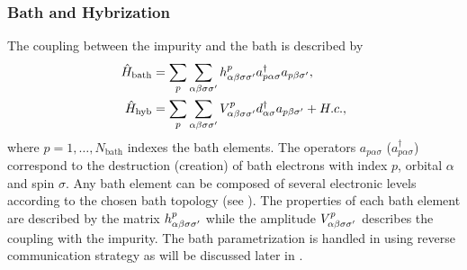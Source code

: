 \documentclass[edipack_sp.tex]{subfiles}
\begin{document}
\subsubsection{Bath and Hybrization}
The coupling between the impurity and the bath is described by
\begin{equation}\label{Hbath}
  \begin{split}
    \hat{H}_\mathrm{bath} &=
    \sum_p\sum_{\alpha\beta\sigma\sigma'}h^p_{\alpha\beta\sigma\sigma'}a^\dagger_{p\alpha\sigma}a_{p\beta\sigma'},\\
    \hat{H}_\mathrm{hyb} &= \sum_p\sum_{\alpha\beta\sigma\sigma'}V^p_{\alpha\beta\sigma\sigma'}d^\dagger_{\alpha\sigma}a_{p\beta\sigma'}+H.c., \\
\end{split}
\end{equation}
where $p=1,\dots,N_\mathrm{bath}$ indexes the
bath elements. The operators $a_{p\alpha\sigma}$
($a^\dagger_{p\alpha\sigma}$) correspond to the destruction (creation) of
bath electrons with index $p$, orbital $\alpha$ and spin $\sigma$.
Any bath element can be composed of several electronic levels
according to the chosen bath topology (see ). The  properties of each bath element are described by the
matrix $h^p_{\alpha\beta\sigma\sigma'}$ while the amplitude
$V^p_{\alpha\beta\sigma\sigma'}$ describes the coupling with the impurity.   
The bath parametrization is handled in \NAME using reverse communication strategy as will be discussed later in .  
\end{document}
